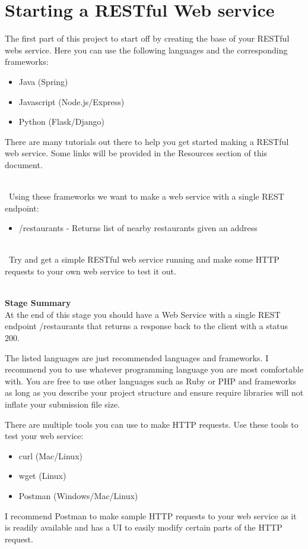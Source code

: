 \documentclass{article}
\begin{document}

\section{Starting a RESTful Web service}
The first part of this project to start off by creating the base of your RESTful webs service. Here you can use the following languages and the corresponding frameworks:
\begin{itemize}
\item Java (Spring)
\item Javascript (Node.js/Express)
\item Python (Flask/Django)
\end{itemize}
There are many tutorials out there to help you get started making a RESTful web service. Some links will be provided in the Resources section of this document. 

\-\\\ Using these frameworks we want to make a web service with a single REST endpoint:
\begin{itemize}
\item /restaurants - Returns list of nearby restaurants given an address
\end{itemize}

\-\\\ Try and get a simple RESTful web service running and make some HTTP requests to your own web service to test it out. 

\-\ \\
\textbf{Stage Summary}\\
At the end of this stage you should have a Web Service with a single REST endpoint /restaurants that returns a response back to the client with a status 200.

\begin{info}[Note:]
The listed languages are just recommended languages and frameworks. I recommend you to use whatever programming language you are most comfortable with. You are free to use other languages such as Ruby or PHP and frameworks as long as you describe your project structure and ensure require libraries will not inflate your submission file size.
\end{info}

\begin{info}
There are multiple tools you can use to make HTTP requests. Use these tools to test your web service:
\begin{itemize}
\item curl (Mac/Linux)
\item wget (Linux)
\item Postman (Windows/Mac/Linux)
\end{itemize}
I recommend Postman to make sample HTTP requests to your web service as it is readily available and has a UI to easily modify certain parts of the HTTP request. 
\end{info}
\end{document}
